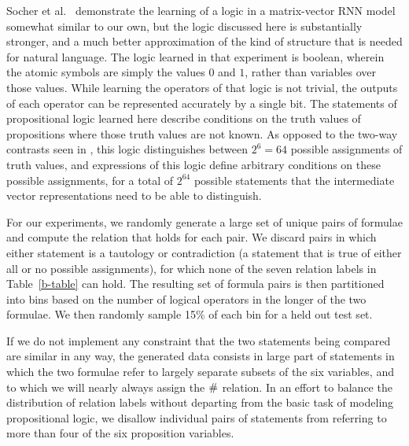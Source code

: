 Socher et al.~\cite{socher2012semantic} demonstrate the learning of a
logic in a matrix-vector RNN model somewhat similar to our own, but
the logic discussed here is substantially stronger, and a much better
approximation of the kind of structure that is needed for natural
language. The logic learned in that experiment is boolean, wherein the
atomic symbols are simply the values $0$ and $1$, rather than
variables over those values. While learning the operators of that
logic is not trivial, the outputs of each operator can be represented
accurately by a single bit. The statements of propositional logic
learned here describe conditions on the truth values of propositions
where those truth values are not known. As opposed to the two-way
contrasts seen in \cite{socher2012semantic}, this logic distinguishes
between $2^{6} = 64$ possible assignments of truth values, and
expressions of this logic define arbitrary conditions on these
possible assignments, for a total of $2^{64}$ %
possible statements that the intermediate vector representations need 
to be able to distinguish.

For our experiments, we randomly generate a large set of  unique pairs 
of formulae and compute the relation that holds for each pair.
We discard pairs in which either statement is a tautology or
contradiction (a statement that is true of either all or no possible
assignments), for which none of the seven relation labels in
Table~\ref{b-table} can hold. The resulting set of formula pairs is
then partitioned into bins based on the number of logical operators in
the longer of the two formulae. We then randomly sample 15\% of each
bin for a held out test set.

If we do not implement any constraint that the two statements
being compared are similar in any way, the generated data consists in
large part of statements in which the two formulae refer to largely
separate subsets of the six variables, and to which we will nearly
always assign the $\mathbin{\#}$ relation. In an effort to balance the
distribution of relation labels without departing from the basic task
of modeling propositional logic, we disallow individual pairs of
statements from referring to more than four of the six proposition
variables.

